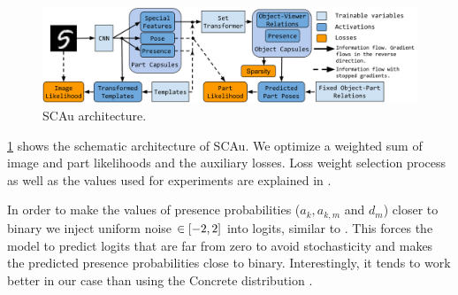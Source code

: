 \begin{figure}
    \centering
    \includegraphics[width=\linewidth]{figures/SCA/sca_architecture_v3}
    \caption{\gls{SCAu} architecture.}
    \label{fig:sca_arch}
\end{figure}
\cref{fig:sca_arch} shows the schematic architecture of \gls{SCAu}. We optimize a weighted sum of image and part likelihoods and the auxiliary losses. 
Loss weight selection process as well as the values used for experiments are explained in .

In order to make the values of presence probabilities ($a_k, a_{k,m}$ and $d_m$) closer to binary we inject uniform noise $\in {\left[-2, 2\right]}$ into logits, similar to \cite{Tieleman2014thesis}.
This forces the model to predict logits that are far from zero to avoid stochasticity and makes the predicted presence probabilities close to binary.
Interestingly, it tends to work better in our case than using the Concrete distribution \citep{Maddison2017concrete}.
